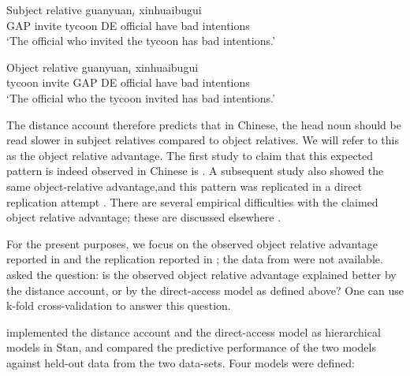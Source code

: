 \documentclass{cambridge7A}\usepackage[]{graphicx}\usepackage[]{color}
\begin{document}
\begin{exe}
\ex  \label{ex:chineseRCs}
\begin{xlist}
\item
Subject relative
 guanyuan$_i$ xinhuaibugui \\
GAP invite tycoon DE official {have bad intentions}\\
\glt `The official who invited the tycoon has bad intentions.’
\item 
Object relative 
 guanyuan$_i$ xinhuaibugui \\
tycoon invite GAP DE official { have bad intentions}\\
\glt `The official who the tycoon invited has bad intentions.’
\end{xlist}
\end{exe}

The distance account therefore predicts that in Chinese, the head noun should be read slower in subject relatives compared to object relatives. We will refer to this as the object relative advantage. The first study to claim that this expected pattern is indeed observed in Chinese is \cite{HsiaoGibson2003}. A  subsequent study \citep{gibsonwu} also showed the same object-relative advantage,and this pattern was replicated in a  direct replication attempt \cite{VasishthetalPLoSOne2013}.  There are several empirical difficulties  with the claimed object relative advantage; these are discussed elsewhere \citep{VasishthetalPLoSOne2013,WuKaiserVasishth2017,JagerChenLi2015}. 

For the present purposes, we focus on the observed object relative advantage reported in \cite{gibsonwu} and the replication reported in \cite{VasishthetalPLoSOne2013}; the data from \cite{HsiaoGibson2003} were not available. \cite{VasishthChopinRyderNicenboimCogSci2017}  asked the question: is the observed  object relative advantage explained better by the distance account, or  by the direct-access model as defined above? One can use k-fold cross-validation  to answer this question.

\cite{VasishthChopinRyderNicenboimCogSci2017} implemented the distance account and the direct-access model as hierarchical models in  Stan, and compared the predictive performance of the two models against held-out data from the two data-sets. Four models were defined:
\end{document}
